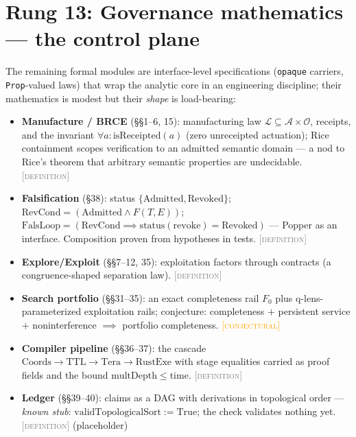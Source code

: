 \documentclass[11pt]{article}
\newcommand{\DEFINITION}{\textcolor{gray}{\textsc{[definition]}}}
\newcommand{\CONJECTURAL}{\textcolor{orange}{\textsc{[conjectural]}}}
\theoremstyle{plain}
\theoremstyle{definition}
\theoremstyle{remark}
\begin{document}
\section{Rung 13: Governance mathematics --- the control plane}
\label{sec:rung13}

The remaining formal modules are interface-level specifications
(\texttt{opaque} carriers, \texttt{Prop}-valued laws) that wrap the
analytic core in an engineering discipline; their mathematics is modest
but their \emph{shape} is load-bearing:

\begin{itemize}[nosep]
  \item \textbf{Manufacture / BRCE} (\S\S1--6, 15): manufacturing law
  $\mathcal{L} \subseteq \mathcal{A} \times \mathcal{O}$, receipts, and
  the invariant $\forall a: \mathrm{isReceipted}(a)$ (zero unreceipted
  actuation); Rice containment scopes verification to an admitted semantic
  domain --- a nod to Rice's theorem that arbitrary semantic properties are
  undecidable. \DEFINITION
  \item \textbf{Falsification} (\S38): status
  $\{\mathrm{Admitted}, \mathrm{Revoked}\}$;
  $\mathrm{RevCond} = (\mathrm{Admitted} \wedge F(T,E))$;
  $\mathrm{FalsLoop} = (\mathrm{RevCond} \implies
  \mathrm{status}(\mathrm{revoke}) = \mathrm{Revoked})$ --- Popper as an
  interface. Composition proven from hypotheses in tests. \DEFINITION
  \item \textbf{Explore/Exploit} (\S\S7--12, 35): exploitation factors
  through contracts (a congruence-shaped separation law). \DEFINITION
  \item \textbf{Search portfolio} (\S\S31--35): an exact completeness rail
  $F_0$ plus q-lens-parameterized exploitation rails; conjecture:
  completeness $+$ persistent service $+$ noninterference $\implies$
  portfolio completeness. \CONJECTURAL
  \item \textbf{Compiler pipeline} (\S\S36--37): the cascade
  $\mathrm{Coords} \to \mathrm{TTL} \to \mathrm{Tera} \to
  \mathrm{RustExe}$ with stage equalities carried as proof fields and the
  bound $\mathrm{multDepth} \le \mathrm{time}$. \DEFINITION
  \item \textbf{Ledger} (\S\S39--40): claims as a DAG with derivations in
  topological order --- \emph{known stub}:
  $\mathrm{validTopologicalSort} := \mathrm{True}$; the check validates
  nothing yet. \DEFINITION{} (placeholder)
\end{itemize}
\end{document}
